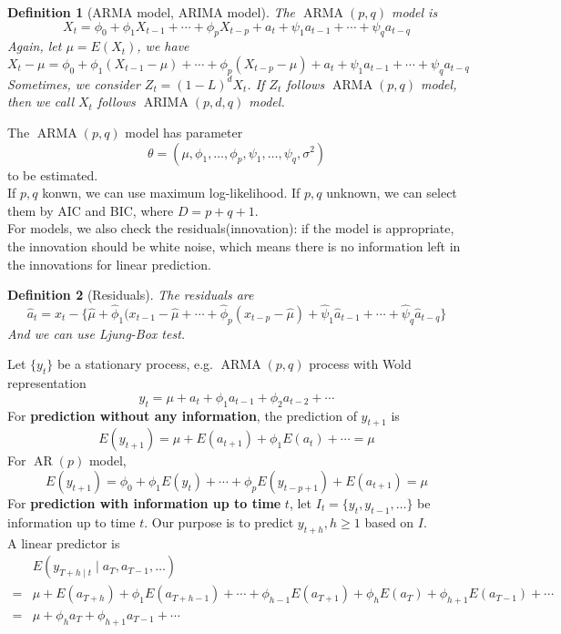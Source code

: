 \documentclass[11pt]{article}
\newtheorem{definition}{Definition}[section]
\theoremstyle{definition}
\DeclareMathOperator{\ARMA}{ARMA}
\DeclareMathOperator{\AR}{AR}
\DeclareMathOperator{\ARIMA}{ARIMA}
\begin{document}
\begin{definition}[ARMA model, ARIMA model]
The $\ARMA(p,q)$ model is
\[
X_t = \phi_0 + \phi_1X_{t-1} + \cdots + \phi_pX_{t-p} + a_t + \psi_1 a_{t-1} + \cdots + \psi_q a_{t-q}
\]
Again, let $\mu = E(X_t)$, we have
\[
X_t-\mu = \phi_0 + \phi_1(X_{t-1}-\mu) + \cdots + \phi_p (X_{t-p}-\mu) + a_t + \psi_1a_{t-1} + \cdots + \psi_q a_{t-q}
\]
Sometimes, we consider $Z_t = (1-L)^d X_t$. If $Z_t$ follows $\ARMA(p,q)$ model, then we call $X_t$ follows $\ARIMA(p, d, q)$ model.
\end{definition}
The $\ARMA(p,q)$ model has parameter 
\[
\theta = (\mu, \phi_1,\ldots, \phi_p, \psi_1,\ldots, \psi_q, \sigma^2)
\]
to be estimated. \\
If $p, q$ konwn, we can use maximum log-likelihood. If $p,q$ unknown, we can select them by AIC and BIC, where $D=p+ q + 1$.\\
For models, we also check the residuals(innovation): if the model is appropriate, the innovation should be white noise, which means there is no information left in the innovations for linear prediction.
\begin{definition}[Residuals]
\normalfont The residuals are
\[
\hat{a}_t = x_t -\{\hat{\mu} + \hat{\phi}_1(x_{t-1}-\hat{\mu} + \cdots + \hat{\phi}_p(x_{t-p}-\hat{\mu}) + \hat{\psi}_1\hat{a}_{t-1} + \cdots + \hat{\psi}_q\hat{a}_{t-q}\}
\]
And we can use Ljung-Box test.
\end{definition}
Let $\{y_t\}$ be a stationary process, e.g. $\ARMA(p,q)$ process with Wold representation
\[
y_t = \mu + a_t + \phi_1 a_{t-1} + \phi_2 a_{t-2} + \cdots
\]
For \textbf{prediction without any information}, the prediction of $y_{t+1}$ is
\[
E(y_{t+1}) = \mu + E(a_{t+1}) + \phi_1E(a_{t}) + \cdots = \mu
\]
For $\AR(p)$ model,
\[
E(y_{t+1}) = \phi_0 + \phi_1E(y_t) + \cdots + \phi_pE(y_{t-p+1}) + E(a_{t+1}) = \mu
\]
For \textbf{prediction with information up to time} $t$, let $I_t = \{y_t, y_{t-1}, \ldots\}$ be information up to time $t$. Our purpose is to predict $y_{t+h}, h\geq 1$ based on $I$.\\
A linear predictor is
\begin{align*}
&E(y_{T+h\mid t}\mid a_{T}, a_{T-1}, \ldots)\\
=&\mu + E(a_{T+h}) + \phi_1E(a_{T+h-1}) + \cdots + \phi_{h-1}E(a_{T+1}) + \phi_hE(a_T) + \phi_{h+1}E(a_{T-1}) + \cdots\\
=&\mu + \phi_ha_T + \phi_{h+1}a_{T-1} + \cdots
\end{align*}
\end{document}
